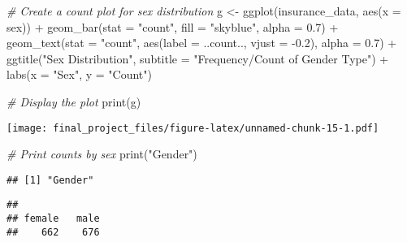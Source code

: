 \documentclass[
]{article}
\newenvironment{Shaded}{\begin{snugshade}}{\end{snugshade}}
\newcommand{\AttributeTok}[1]{\textcolor[rgb]{0.77,0.63,0.00}{#1}}
\newcommand{\CommentTok}[1]{\textcolor[rgb]{0.56,0.35,0.01}{\textit{#1}}}
\newcommand{\FloatTok}[1]{\textcolor[rgb]{0.00,0.00,0.81}{#1}}
\newcommand{\FunctionTok}[1]{\textcolor[rgb]{0.00,0.00,0.00}{#1}}
\newcommand{\NormalTok}[1]{#1}
\newcommand{\OtherTok}[1]{\textcolor[rgb]{0.56,0.35,0.01}{#1}}
\newcommand{\SpecialCharTok}[1]{\textcolor[rgb]{0.00,0.00,0.00}{#1}}
\newcommand{\StringTok}[1]{\textcolor[rgb]{0.31,0.60,0.02}{#1}}
\begin{document}
\begin{Shaded}
\begin{Highlighting}[]
\CommentTok{\# Create a count plot for sex distribution}
\NormalTok{g }\OtherTok{\textless{}{-}} \FunctionTok{ggplot}\NormalTok{(insurance\_data, }\FunctionTok{aes}\NormalTok{(}\AttributeTok{x =}\NormalTok{ sex)) }\SpecialCharTok{+}
  \FunctionTok{geom\_bar}\NormalTok{(}\AttributeTok{stat =} \StringTok{"count"}\NormalTok{, }\AttributeTok{fill =} \StringTok{"skyblue"}\NormalTok{, }\AttributeTok{alpha =} \FloatTok{0.7}\NormalTok{) }\SpecialCharTok{+}
  \FunctionTok{geom\_text}\NormalTok{(}\AttributeTok{stat =} \StringTok{"count"}\NormalTok{, }\FunctionTok{aes}\NormalTok{(}\AttributeTok{label =}\NormalTok{ ..count.., }\AttributeTok{vjust =} \SpecialCharTok{{-}}\FloatTok{0.2}\NormalTok{), }\AttributeTok{alpha =} \FloatTok{0.7}\NormalTok{) }\SpecialCharTok{+}
  \FunctionTok{ggtitle}\NormalTok{(}\StringTok{"Sex Distribution"}\NormalTok{, }\AttributeTok{subtitle =} \StringTok{"Frequency/Count of Gender Type"}\NormalTok{) }\SpecialCharTok{+}
  \FunctionTok{labs}\NormalTok{(}\AttributeTok{x =} \StringTok{"Sex"}\NormalTok{, }\AttributeTok{y =} \StringTok{"Count"}\NormalTok{)}

\CommentTok{\# Display the plot}
\FunctionTok{print}\NormalTok{(g)}
\end{Highlighting}
\end{Shaded}

\texttt{[image: final\_project\_files/figure-latex/unnamed-chunk-15-1.pdf]}

\begin{Shaded}
\begin{Highlighting}[]
\CommentTok{\# Print counts by sex}
\FunctionTok{print}\NormalTok{(}\StringTok{"Gender"}\NormalTok{)}
\end{Highlighting}
\end{Shaded}

\begin{verbatim}
## [1] "Gender"
\end{verbatim}

\begin{Shaded}
\end{Shaded}

\begin{verbatim}
## 
## female   male 
##    662    676
\end{verbatim}
\end{document}
